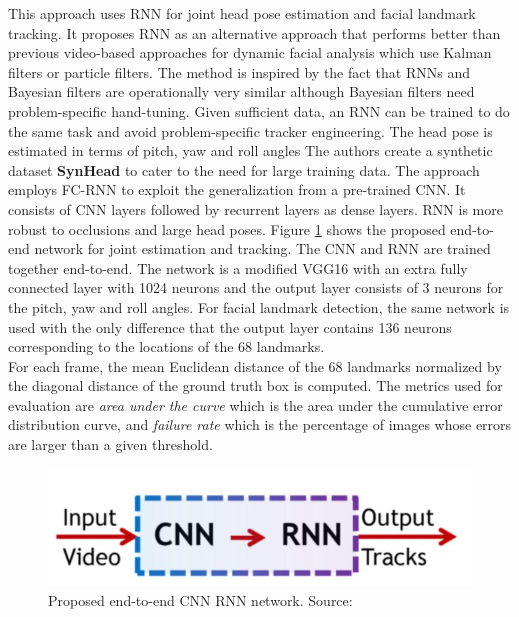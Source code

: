 \documentclass{llncs}
\begin{document}
This approach uses RNN for joint head pose estimation and facial landmark tracking. 
It proposes RNN as an alternative approach that performs better than previous video-based approaches for dynamic facial analysis which use Kalman filters or particle filters. The method is inspired by the fact that RNNs and Bayesian filters are operationally very similar although  Bayesian filters need problem-specific hand-tuning. Given sufficient data, an RNN can be trained to do the same task and avoid problem-specific tracker engineering. The head pose is estimated in terms of pitch, yaw and roll angles
The authors create a synthetic dataset \textbf{SynHead} to cater to the need for large training data. The approach employs FC-RNN to exploit the generalization from a pre-trained CNN. It consists of CNN layers followed by recurrent layers as dense layers. RNN is more robust to occlusions and large head poses. Figure \ref{cnn_rnn} shows the proposed end-to-end network for joint estimation and tracking. The CNN and RNN are trained together end-to-end. The network is a modified VGG16 with an extra fully connected layer with 1024 neurons and the output layer consists of 3 neurons for the pitch, yaw and roll angles. For facial landmark detection, the same network is used with the only difference that the output layer contains 136 neurons corresponding to the locations of the 68 landmarks.\\


For each frame, the mean Euclidean distance of the 68 landmarks normalized by the diagonal distance of the ground truth box is computed. The metrics used for evaluation are \textit{area under the curve} which is the area under the cumulative error distribution curve, and \textit{failure rate} which is the percentage of images whose errors are larger than a given threshold.

\begin{figure}
\centering
\includegraphics[scale=0.5]{Media/cnn_rnn}
\caption{Proposed end-to-end CNN RNN network. Source:\cite{dynamic_facial_analysis}}
\label{cnn_rnn}
\end{figure}
\end{document}
